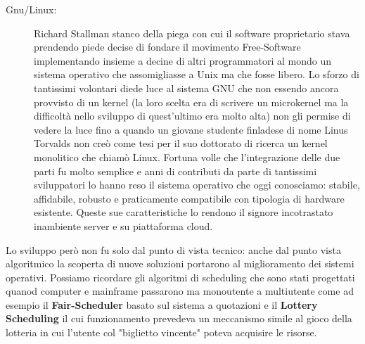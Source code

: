\begin{description}
  \item[Gnu/Linux:] Richard Stallman stanco della piega con cui il software proprietario stava prendendo piede decise di fondare il movimento Free-Software implementando insieme a decine di altri programmatori al mondo un sistema operativo che assomigliasse a Unix ma che fosse libero. Lo sforzo di tantissimi volontari diede luce al sistema GNU che non essendo ancora provvisto di un kernel (la loro scelta era di scrivere un microkernel ma la difficoltà nello sviluppo di quest'ultimo era molto alta) non gli permise di vedere la luce fino a quando un giovane studente finladese di nome Linus Torvalds non creò come tesi per il suo dottorato di ricerca un kernel monolitico che chiamò Linux. Fortuna volle che l'integrazione delle due parti fu molto semplice e anni di contributi da parte di tantissimi sviluppatori lo hanno reso il sistema operativo che oggi conosciamo: stabile, affidabile, robusto e praticamente compatibile con tipologia di hardware esistente. Queste sue caratteristiche lo rendono il signore incotrastato inambiente server e su piattaforma cloud.
\end{description}
Lo sviluppo però non fu solo dal punto di vista tecnico: anche dal punto vista algoritmico la scoperta di nuove soluzioni portarono al miglioramento dei sistemi operativi. Possiamo ricordare gli algoritmi di scheduling che sono stati progettati quanod computer e mainframe passarono ma monoutente a multiutente come ad esempio il \textbf{Fair-Scheduler} basato sul sistema a quotazioni e il \textbf{Lottery Scheduling} il cui funzionamento prevedeva un meccanismo simile al gioco della lotteria in cui l'utente col "biglietto vincente" poteva acquisire le risorse.
